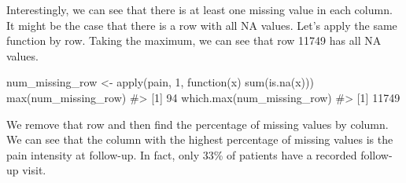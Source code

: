 \documentclass[
  letterpaper,
]{latex/krantz}
\makeatletter
\newenvironment{Shaded}{\begin{snugshade}}{\end{snugshade}}
\newcommand{\CommentTok}[1]{\textcolor[rgb]{0.37,0.37,0.37}{#1}}
\newcommand{\ControlFlowTok}[1]{\textcolor[rgb]{0.00,0.23,0.31}{#1}}
\newcommand{\DecValTok}[1]{\textcolor[rgb]{0.68,0.00,0.00}{#1}}
\newcommand{\FunctionTok}[1]{\textcolor[rgb]{0.28,0.35,0.67}{#1}}
\newcommand{\NormalTok}[1]{\textcolor[rgb]{0.00,0.23,0.31}{#1}}
\newcommand{\OtherTok}[1]{\textcolor[rgb]{0.00,0.23,0.31}{#1}}
\newenvironment{kframe}{%
\medskip{}
\setlength{\fboxsep}{.8em}
 \def\at@end@of@kframe{}%
 \ifinner\ifhmode%
  \def\at@end@of@kframe{\end{minipage}}%
  \begin{minipage}{\columnwidth}%
 \fi\fi%
 \def\FrameCommand##1{\hskip\@totalleftmargin \hskip-\fboxsep
 \colorbox{shadecolor}{##1}\hskip-\fboxsep
     \hskip-\linewidth \hskip-\@totalleftmargin \hskip\columnwidth}%
 \MakeFramed {\advance\hsize-\width
   \@totalleftmargin\z@ \linewidth\hsize
   \@setminipage}}%
 {\par\unskip\endMakeFramed%
 \at@end@of@kframe}
\renewenvironment{Shaded}{\begin{kframe}}{\end{kframe}}
\makeatother
\begin{document}
Interestingly, we can see that there is at least one missing value in
each column. It might be the case that there is a row with all NA
values. Let's apply the same function by row. Taking the maximum, we can
see that row 11749 has all NA values.

\begin{Shaded}
\begin{Highlighting}[]
\NormalTok{num\_missing\_row }\OtherTok{\textless{}{-}} \FunctionTok{apply}\NormalTok{(pain, }\DecValTok{1}\NormalTok{, }\ControlFlowTok{function}\NormalTok{(x) }\FunctionTok{sum}\NormalTok{(}\FunctionTok{is.na}\NormalTok{(x)))}
\FunctionTok{max}\NormalTok{(num\_missing\_row)}
\CommentTok{\#\textgreater{} [1] 94}
\FunctionTok{which.max}\NormalTok{(num\_missing\_row)}
\CommentTok{\#\textgreater{} [1] 11749}
\end{Highlighting}
\end{Shaded}

We remove that row and then find the percentage of missing values by
column. We can see that the column with the highest percentage of
missing values is the pain intensity at follow-up. In fact, only 33\% of
patients have a recorded follow-up visit.
\end{document}
